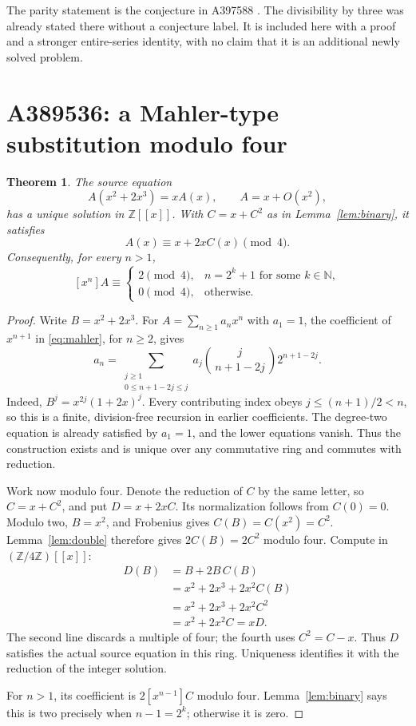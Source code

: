 \documentclass[11pt,a4paper]{article}
\newtheorem{theorem}{Theorem}[section]
\theoremstyle{remark}
\newcommand{\Z}{\mathbb Z}
\newcommand{\N}{\mathbb N}
\newcommand{\ps}[1]{#1[[x]]}
\begin{document}
The parity statement is the conjecture in A397588 \cite{oeis588}.
The divisibility by three was already stated there without a conjecture
label. It is included here with a proof and a stronger entire-series
identity, with no claim that it is an additional newly solved problem.

\section{A389536: a Mahler-type substitution modulo four}

\begin{theorem}\label{thm:mahler}
The source equation
\begin{equation}\label{eq:mahler}
 A(x^2+2x^3)=xA(x),\qquad A=x+O(x^2),
\end{equation}
has a unique solution in $\ps{\Z}$. With $C=x+C^2$ as in
Lemma~\ref{lem:binary}, it satisfies
\[
 A(x)\equiv x+2xC(x)\pmod4.
\]
Consequently, for every $n>1$,
\[
 [x^n]A\equiv
 \begin{cases}
  2\pmod4,&n=2^k+1\text{ for some }k\in\N,\\
  0\pmod4,&\text{otherwise}.
 \end{cases}
\]
\end{theorem}

\begin{proof}
Write $B=x^2+2x^3$. For $A=\sum_{n\ge1}a_nx^n$ with $a_1=1$, the
coefficient of $x^{n+1}$ in \eqref{eq:mahler}, for $n\ge2$, gives
\begin{equation}\label{eq:mahlerrec}
 a_n=
 \sum_{\substack{j\ge1\\0\le n+1-2j\le j}}
 a_j\binom{j}{\,n+1-2j\,}2^{n+1-2j}.
\end{equation}
Indeed, $B^j=x^{2j}(1+2x)^j$. Every contributing index obeys
$j\le(n+1)/2<n$, so this is a finite, division-free recursion in earlier
coefficients. The degree-two equation is already satisfied by $a_1=1$,
and the lower equations vanish. Thus the construction exists and is
unique over any commutative ring and commutes with reduction.

Work now modulo four. Denote the reduction of $C$ by the same letter,
so $C=x+C^2$, and put $D=x+2xC$. Its normalization follows from $C(0)=0$.
Modulo two, $B=x^2$, and Frobenius gives $C(B)=C(x^2)=C^2$.
Lemma~\ref{lem:double} therefore gives $2C(B)=2C^2$ modulo four. Compute
in $(\Z/4\Z)[[x]]$:
\begin{align*}
 D(B)
 &=B+2B\,C(B)\\
 &=x^2+2x^3+2x^2C(B)\\
 &=x^2+2x^3+2x^2C^2\\
 &=x^2+2x^2C=xD.
\end{align*}
The second line discards a multiple of four; the fourth uses $C^2=C-x$.
Thus $D$ satisfies the actual source equation in this ring. Uniqueness
identifies it with the reduction of the integer solution.

For $n>1$, its coefficient is $2[x^{n-1}]C$ modulo four.
Lemma~\ref{lem:binary} says this is two precisely when $n-1=2^k$;
otherwise it is zero.
\end{proof}
\end{document}
